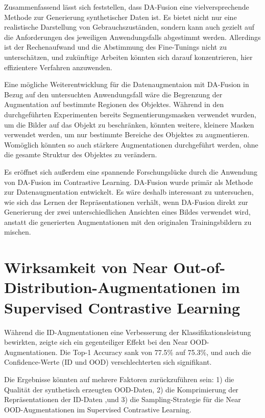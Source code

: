 Zusammenfassend lässt sich feststellen, dass DA-Fusion eine vielversprechende Methode zur Generierung synthetischer Daten ist. Es bietet nicht nur eine realistische Darstellung von Gebrauchszuständen, sondern kann auch gezielt auf die Anforderungen des jeweiligen Anwendungsfalls abgestimmt werden. Allerdings ist der Rechenaufwand und die Abstimmung des Fine-Tunings nicht zu unterschätzen, und zukünftige Arbeiten könnten sich darauf konzentrieren, hier effizientere Verfahren anzuwenden.

Eine mögliche Weiterentwicklung für die Datenaugmentaion mit DA-Fusion in Bezug auf den untersuchten Anwendungsfall wäre die Begrenzung der Augmentation auf bestimmte Regionen des Objektes. Während in den durchgeführten Experimenten bereits Segmentierungsmasken verwendet wurden, um die Bilder auf das Objekt zu beschränken, könnten weitere, kleinere Masken verwendet werden, um nur bestimmte Bereiche des Objektes zu augmentieren. Womöglich könnten so auch stärkere Augmentationen durchgeführt werden, ohne die gesamte Struktur des Objektes zu verändern.

Es eröffnet sich außerdem eine spannende Forschungslücke durch die Anwendung von DA-Fusion im Contrastive Learning. DA-Fusion wurde primär als Methode zur Datenaugmentation entwickelt. Es wäre deshalb interessant zu untersuchen, wie sich das Lernen der Repräsentationen verhält, wenn DA-Fusion direkt zur Generierung der zwei unterschiedlichen Ansichten eines Bildes verwendet wird, anstatt die generierten Augmentationen mit den originalen Trainingsbildern zu mischen.

\section{Wirksamkeit von Near Out-of-Distribution-Augmentationen im Supervised Contrastive Learning} \label{sec:ood-discussion}

Während die ID-Augmentationen eine Verbesserung der Klassifikationsleistung bewirkten, zeigte sich ein gegenteiliger Effekt bei den Near OOD-Augmentationen. Die Top-1 Accuracy sank von 77.5\% auf 75.3\%, und auch die Confidence-Werte (ID und OOD) verschlechterten sich signifikant.

Die Ergebnisse könnten auf mehrere Faktoren zurückzuführen sein: 1) die Qualität der synthetisch erzeugten OOD-Daten, 2) die Komprimierung der Repräsentationen der ID-Daten ,und 3) die Sampling-Strategie für die Near OOD-Augmentationen im Supervised Contrastive Learning.

